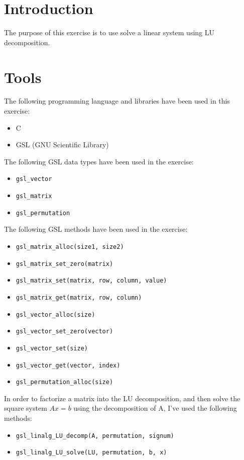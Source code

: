 \documentclass{article}
\newcommand{\code}{\texttt}
\begin{document}

\section{Introduction}\label{sec:intro}
The purpose of this exercise is to use solve a linear system using LU decomposition.\\

\section{Tools}
The following programming language and libraries have been used in this exercise:
\begin{itemize}
  \item C
  \item GSL (GNU Scientific Library)
\end{itemize}
The following GSL data types have been used in the exercise:
\begin{itemize}
  \item \code{gsl\_vector}
  \item \code{gsl\_matrix}
  \item \code{gsl\_permutation}
\end{itemize}
The following GSL methods have been used in the exercise:
\begin{itemize}
  \item \code{gsl\_matrix\_alloc(size1, size2)}
  \item \code{gsl\_matrix\_set\_zero(matrix)}
  \item \code{gsl\_matrix\_set(matrix, row, column, value)}
  \item \code{gsl\_matrix\_get(matrix, row, column)}
  \item \code{gsl\_vector\_alloc(size)}
  \item \code{gsl\_vector\_set\_zero(vector)}
  \item \code{gsl\_vector\_set(size)}
  \item \code{gsl\_vector\_get(vector, index)}
  \item \code{gsl\_permutation\_alloc(size)}
\end{itemize}
In order to factorize a matrix into the LU decomposition, and then solve the square system $Ax=b$ using the decomposition of A, I've used the following methods:
\begin{itemize}
  \item \code{gsl\_linalg\_LU\_decomp(A, permutation, signum)}
  \item \code{gsl\_linalg\_LU\_solve(LU, permutation, b, x)}
\end{itemize}
  
\end{document}
